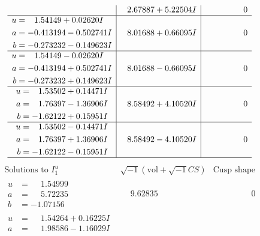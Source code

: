 \documentclass[1p]{elsarticle_modified}
\theoremstyle{definition}
\newcommand{\I}{\sqrt{-1}}
\begin{document}
$$\begin{array}{c|c|c}
 & \phantom{-}2.67887 + 5.22504 I & \phantom{-0.000000 } 0 \\ \hline\begin{aligned}
u &= \phantom{-}1.54149 + 0.02620 I \\
a &= -0.413194 - 0.502741 I \\
b &= -0.273232 - 0.149623 I\end{aligned}
 & \phantom{-}8.01688 + 0.66095 I & \phantom{-0.000000 } 0 \\ \hline\begin{aligned}
u &= \phantom{-}1.54149 - 0.02620 I \\
a &= -0.413194 + 0.502741 I \\
b &= -0.273232 + 0.149623 I\end{aligned}
 & \phantom{-}8.01688 - 0.66095 I & \phantom{-0.000000 } 0 \\ \hline\begin{aligned}
u &= \phantom{-}1.53502 + 0.14471 I \\
a &= \phantom{-}1.76397 - 1.36906 I \\
b &= -1.62122 + 0.15951 I\end{aligned}
 & \phantom{-}8.58492 + 4.10520 I & \phantom{-0.000000 } 0 \\ \hline\begin{aligned}
u &= \phantom{-}1.53502 - 0.14471 I \\
a &= \phantom{-}1.76397 + 1.36906 I \\
b &= -1.62122 - 0.15951 I\end{aligned}
 & \phantom{-}8.58492 - 4.10520 I & \phantom{-0.000000 } 0\\
 \hline 
 \end{array}$$\newpage$$\begin{array}{c|c|c}  
\text{Solutions to }I^u_{1}& \I (\text{vol} + \sqrt{-1}CS) & \text{Cusp shape}\\
 \hline 
\begin{aligned}
u &= \phantom{-}1.54999\phantom{ +0.000000I} \\
a &= \phantom{-}5.72235\phantom{ +0.000000I} \\
b &= -1.07156\phantom{ +0.000000I}\end{aligned}
 & \phantom{-}9.62835\phantom{ +0.000000I} & \phantom{-0.000000 } 0 \\ \hline\begin{aligned}
u &= \phantom{-}1.54264 + 0.16225 I \\
a &= \phantom{-}1.98586 - 1.16029 I \\

\end{aligned}
\end{array}$$
\end{document}
